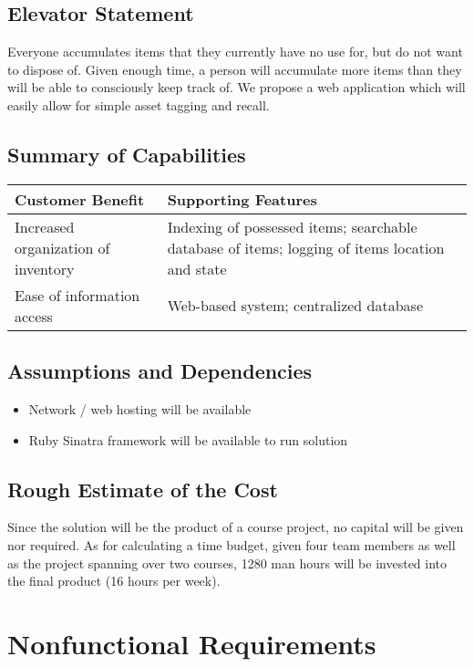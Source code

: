 \documentclass{article}
\begin{document}
\subsection{Elevator Statement}
Everyone accumulates items that they currently have no use for, but do not want to dispose of.  Given enough time, a person will accumulate more items than they will be able to consciously keep track of. We propose a web application which will easily allow for simple asset tagging and recall.

\subsection{Summary of Capabilities}
\begin{tabular}{ | p{2.5in} | p{3.5in} | }
\hline
\textbf{Customer Benefit} & \textbf{Supporting Features}\\
\hline
\hline
Increased organization of inventory & Indexing of possessed items; searchable database of items; logging of items location and state\\
\hline
Ease of information access & Web-based system; centralized database\\
\hline
\end{tabular}

\subsection{Assumptions and Dependencies}
\begin{itemize}
\item Network / web hosting will be available
\item Ruby Sinatra framework will be available to run solution
\end{itemize}

\subsection{Rough Estimate of the Cost}
Since the solution will be the product of a course project, no capital will be given nor required.  As for calculating a time budget, given four team members as well as the project spanning over two courses, 1280 man hours will be invested into the final product (16 hours per week).

\section{Nonfunctional Requirements}
\end{document}
